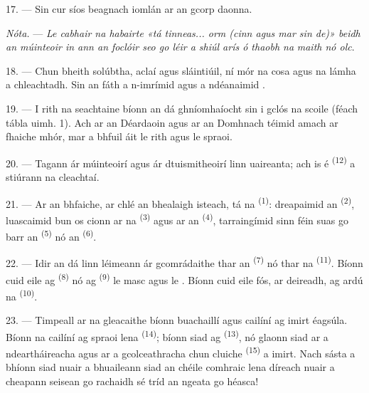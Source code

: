 17. --- Sin cur síos beagnach iomlán ar an gcorp daonna.

\textit{Nóta.} --- \textit{Le cabhair na habairte «tá tinneas... orm (cinn agus
mar sin de)» beidh an múinteoir in ann an foclóir seo go léir a shiúl arís ó
thaobh na}  \textit{maith nó olc}.

\VUsaut{5.0mm}
\VUsaut{2.4mm}
\VUsaut{3.0mm}

18. --- Chun bheith solúbtha, aclaí agus sláintiúil, ní mór na cosa agus na lámha a
chleachtadh. Sin an fáth a n-imrímid agus a ndéanaimid .

19. --- I rith na seachtaine bíonn an dá ghníomhaíocht sin i gclós na scoile (féach
tábla uimh. 1). Ach ar an Déardaoin agus ar an Domhnach téimid amach ar fhaiche
mhór, mar a bhfuil áit le rith agus le spraoi.

20. --- Tagann ár múinteoirí agus ár dtuismitheoirí linn uaireanta; ach is é
 \textsuperscript{(12)} a stiúrann na
cleachtaí.

21. --- Ar an bhfaiche, ar chlé an bhealaigh isteach, tá na  \textsuperscript{(1)}: dreapaimid an 
\textsuperscript{(2)}, luascaimid bun os cionn ar na 
\textsuperscript{(3)} agus ar an  \textsuperscript{(4)}, tarraingímid
sinn féin suas go barr an  \textsuperscript{(5)} nó an
 \textsuperscript{(6)}.

22. --- Idir an dá linn léimeann ár gcomrádaithe thar an 
\textsuperscript{(7)} nó thar na 
\textsuperscript{(11)}. Bíonn cuid eile ag 
\textsuperscript{(8)} nó ag  \textsuperscript{(9)} le masc
agus le . Bíonn cuid eile fós, ar deireadh, ag ardú na
 \textsuperscript{(10)}.

\VUsaut{4.6mm}
\VUsaut{3.0mm}

23. --- Timpeall ar na gleacaithe bíonn buachaillí agus cailíní ag imirt
 éagsúla. Bíonn na cailíní ag spraoi lena 
\textsuperscript{(14)}; bíonn siad ag 
\textsuperscript{(13)}, nó glaonn siad ar a ndeartháireacha agus ar a
gcolceathracha chun cluiche  \textsuperscript{(15)} a imirt. Nach
sásta a bhíonn siad nuair a bhuaileann siad  an chéile comhraic
lena  díreach nuair a cheapann seisean go rachaidh sé tríd
an ngeata go héasca!

